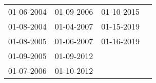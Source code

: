 \begin{supertabular}{llll}
 01-06-2004 &  01-09-2006 &  01-10-2015 \\
 01-08-2004 &  01-04-2007 &  01-15-2019 \\
 01-08-2005 &  01-06-2007 &  01-16-2019 \\
 01-09-2005 &  01-09-2012 &             \\
 01-07-2006 &  01-10-2012 &             \\
\end{supertabular}
